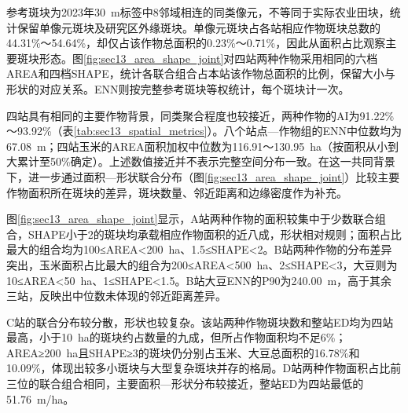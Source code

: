 参考斑块为2023年30~m标签中8邻域相连的同类像元，不等同于实际农业田块，统计保留单像元斑块及研究区外缘斑块。单像元斑块占各站相应作物斑块总数的44.31\%～54.64\%，却仅占该作物总面积的0.23\%～0.71\%，因此从面积占比观察主要斑块形态。图\ref{fig:sec13_area_shape_joint}对四站两种作物采用相同的六档AREA和四档SHAPE，统计各联合组合占本站该作物总面积的比例，保留大小与形状的对应关系。ENN则按完整参考斑块等权统计，每个斑块计一次。

四站具有相同的主要作物背景，同类聚合程度也较接近，两种作物的AI为91.22\%～93.92\%（表\ref{tab:sec13_spatial_metrics}）。八个站点—作物组的ENN中位数均为67.08~m；四站玉米的AREA面积加权中位数为116.91～130.95~ha（按面积从小到大累计至50\%确定）。上述数值接近并不表示完整空间分布一致。在这一共同背景下，进一步通过面积—形状联合分布（图\ref{fig:sec13_area_shape_joint}）比较主要作物面积所在斑块的差异，斑块数量、邻近距离和边缘密度作为补充。

图\ref{fig:sec13_area_shape_joint}显示，A站两种作物的面积较集中于少数联合组合，SHAPE小于2的斑块均承载相应作物面积的近八成，形状相对规则；面积占比最大的组合均为100≤AREA<200~ha、1.5≤SHAPE<2。B站两种作物的分布差异突出，玉米面积占比最大的组合为200≤AREA<500~ha、2≤SHAPE<3，大豆则为10≤AREA<50~ha、1≤SHAPE<1.5。B站大豆ENN的P90为240.00~m，高于其余三站，反映出中位数未体现的邻近距离差异。

C站的联合分布较分散，形状也较复杂。该站两种作物斑块数和整站ED均为四站最高，小于10~ha的斑块约占数量的九成，但所占作物面积均不足6\%；AREA≥200~ha且SHAPE≥3的斑块仍分别占玉米、大豆总面积的16.78\%和10.09\%，体现出较多小斑块与大型复杂斑块并存的格局。D站两种作物面积占比前三位的联合组合相同，主要面积—形状分布较接近，整站ED为四站最低的51.76~m/ha。

